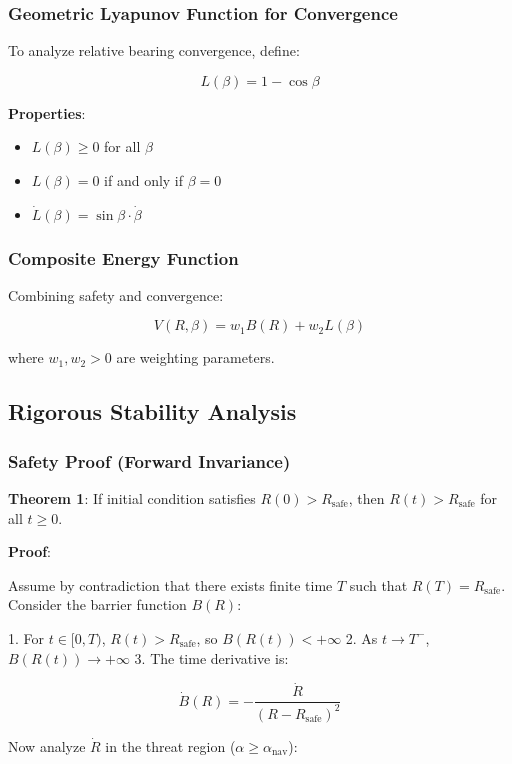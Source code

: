 \documentclass[11pt,a4paper]{article}
\numberwithin{equation}{section}
\begin{document}
\subsubsection{Geometric Lyapunov Function for Convergence}

To analyze relative bearing convergence, define:

\[
L(\beta) = 1 - \cos\beta
\]

\textbf{Properties}:
\begin{itemize}
\item $L(\beta) \geq 0$ for all $\beta$
\item $L(\beta) = 0$ if and only if $\beta = 0$
\item $\dot{L}(\beta) = \sin\beta \cdot \dot{\beta}$
\end{itemize}

\subsubsection{Composite Energy Function}

Combining safety and convergence:

\[
V(R, \beta) = w_1 B(R) + w_2 L(\beta)
\]

where $w_1, w_2 > 0$ are weighting parameters.

\subsection{Rigorous Stability Analysis}

\subsubsection{Safety Proof (Forward Invariance)}

\textbf{Theorem 1}: If initial condition satisfies $R(0) > R_{\text{safe}}$, then $R(t) > R_{\text{safe}}$ for all $t \geq 0$.

\textbf{Proof}:

Assume by contradiction that there exists finite time $T$ such that $R(T) = R_{\text{safe}}$. Consider the barrier function $B(R)$:

1. For $t \in [0, T)$, $R(t) > R_{\text{safe}}$, so $B(R(t)) < +\infty$
2. As $t \to T^-$, $B(R(t)) \to +\infty$
3. The time derivative is:

\[
\dot{B}(R) = -\frac{\dot{R}}{(R - R_{\text{safe}})^2}
\]

Now analyze $\dot{R}$ in the threat region ($\alpha \geq \alpha_{\text{nav}}$):
\end{document}
